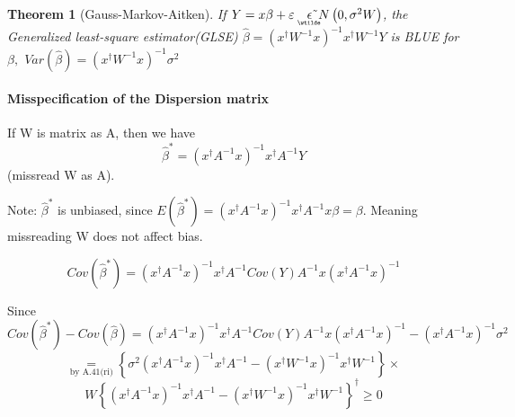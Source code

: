 \documentclass{article}
\newtheorem{theorem}{Theorem}
\begin{document}
\begin{theorem}[Gauss-Markov-Aitken]
If $Y=x\beta +\varepsilon \quad 
\underaccent{\wtilde}{\epsilon}%
\symbol{126}N\left( 0,\sigma ^{2}W\right) $, the Generalized least-square
estimator(GLSE) $\hat{\beta}=\left( x^{\dagger }W^{-1}x\right)
^{-1}x^{\dagger }W^{-1}Y$ is BLUE for $\beta ,$ $Var\left( \hat{\beta}%
\right) =\left( x^{\dagger }W^{-1}x\right) ^{-1}\sigma ^{2}$
\end{theorem}

\paragraph{Misspecification of the Dispersion matrix}

\bigskip 

If W is matrix as A, then we have%
\begin{equation*}
\hat{\beta}^{\ast }=\left( x^{\dagger }A^{-1}x\right) ^{-1}x^{\dagger
}A^{-1}Y
\end{equation*}%
(missread W as A).

\bigskip

Note: $\hat{\beta}^{\ast }$ is unbiased, since $E\left( \hat{\beta}^{\ast
}\right) =\left( x^{\dagger }A^{-1}x\right) ^{-1}x^{\dagger }A^{-1}x\beta
=\beta $. Meaning missreading W does not affect bias.

\begin{equation*}
Cov\left( \hat{\beta}^{\ast }\right) =\left( x^{\dagger }A^{-1}x\right)
^{-1}x^{\dagger }A^{-1}Cov\left( Y\right) A^{-1}x\left( x^{\dagger
}A^{-1}x\right) ^{-1}
\end{equation*}%
\qquad 

\bigskip

Since $Cov\left( \hat{\beta}^{\ast }\right) -Cov\left( \hat{\beta}\right)
=\left( x^{\dagger }A^{-1}x\right) ^{-1}x^{\dagger }A^{-1}Cov\left( Y\right)
A^{-1}x\left( x^{\dagger }A^{-1}x\right) ^{-1}-\left( x^{\dagger
}A^{-1}x\right) ^{-1}\sigma ^{2}$%
\begin{equation*}
\underset{\text{by A.41(ri)}}{=}\left\{ \sigma ^{2}\left( x^{\dagger
}A^{-1}x\right) ^{-1}x^{\dagger }A^{-1}-\left( x^{\dagger }W^{-1}x\right)
^{-1}x^{\dagger }W^{-1}\right\} \times
\end{equation*}%
\begin{equation*}
W\left\{ \left( x^{\dagger }A^{-1}x\right) ^{-1}x^{\dagger }A^{-1}-\left(
x^{\dagger }W^{-1}x\right) ^{-1}x^{\dagger }W^{-1}\right\} ^{\dagger }\geq 0
\end{equation*}
\end{document}
